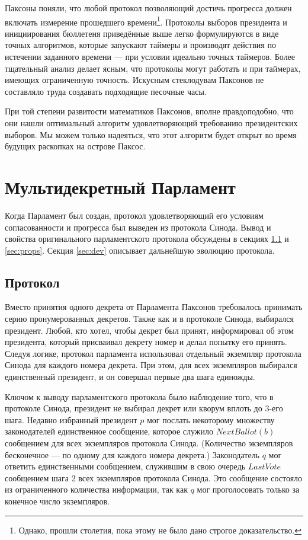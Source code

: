 \documentclass[12pt, a4paper]{article} %
\begin{document}
Паксоны поняли, что любой протокол позволяющий достичь прогресса должен включать измерение прошедшего времени\footnote{Однако, прошли столетия, пока этому не было дано строгое доказательство.}. Протоколы выборов президента и инициирования бюллетеня приведённые выше легко формулируются в виде точных алгоритмов, которые запускают таймеры и производят действия по истечении заданного времени --- при условии идеально точных таймеров. Более тщательный анализ делает ясным, что протоколы могут работать и при таймерах, имеющих ограниченную точность. Искусным стеклодувам Паксонов не составляло труда создавать подходящие песочные часы. 

При той степени развитости математиков Паксонов, вполне правдоподобно, что они нашли оптимальный алгоритм удовлетворяющий требованию президентских выборов. Мы можем только надеяться, что этот алгоритм будет открыт во время будущих раскопках на острове Паксос.

\newpage
\section{Мультидекретный Парламент}\label{sec:parlamentprot}

Когда Парламент был создан, протокол удовлетворяющий его условиям согласованности и прогресса был выведен из протокола Синода. Вывод и свойства оригинального парламентского протокола обсуждены в секциях \ref{sec:protocol} и \ref{sec:props}. Секция \ref{sec:dev} описывает дальнейшую эволюцию протокола.

\subsection{Протокол}\label{sec:protocol}

Вместо принятия одного декрета от Парламента Паксонов требовалось принимать серию пронумерованных декретов. Также как и в протоколе Синода, выбирался президент. Любой, кто хотел, чтобы декрет был принят, информировал об этом президента, который присваивал декрету номер и делал попытку его принять. Следуя логике, протокол парламента использовал отдельный экземпляр протокола Синода для каждого номера декрета. При этом, для всех экземпляров выбирался единственный президент, и он совершал первые два шага единожды.

Ключом к выводу парламентского протокола было наблюдение того, что в протоколе Синода, президент не выбирал декрет или кворум вплоть до 3-его шага. Недавно избранный президент $p$ мог послать некоторому множеству законодателей единственное сообщение, которое служило $NextBallot(b)$ сообщением для всех экземпляров протокола Синода. (Количество экземпляров бесконечное --- по одному для каждого номера декрета.) Законодатель $q$ мог ответить единственными сообщением, служившим в свою очередь $LastVote$ сообщением шага 2 всех экземпляров протокола Синода. Это сообщение состояло из ограниченного количества информации, так как $q$ мог проголосовать только за конечное число экземпляров.
\end{document}
